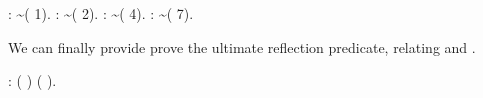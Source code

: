 \begin{exercise}
\begin{coqdoccode}
\coqdocemptyline
\coqdocnoindent
{} : \~{}( 1).\coqdoceol
\coqdocemptyline
\coqdocnoindent
{} : \~{}( 2).\coqdoceol
\coqdocemptyline
\coqdocnoindent
{} : \~{}( 4).\coqdoceol
\coqdocemptyline
\coqdocnoindent
{} : \~{}( 7).\coqdoceol
\coqdocemptyline
\end{coqdoccode}


\noindent We can finally provide prove the ultimate reflection
predicate, relating  and .


\begin{coqdoccode}
\coqdocnoindent
{}   :  ( ) ( ).\coqdoceol
\coqdocemptyline
\end{coqdoccode}


\end{exercise}







